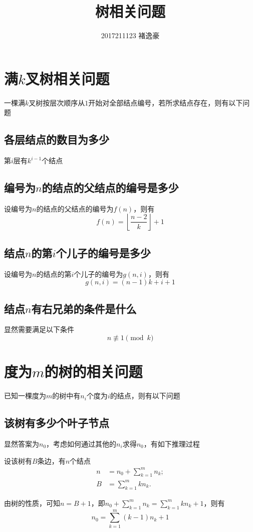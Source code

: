 \documentclass[UTF8]{ctexart}
\author{2017211123 褚逸豪}
\title{树相关问题}
\begin{document}
    \maketitle
    \section{满$k$叉树相关问题}
        一棵满$k$叉树按层次顺序从$1$开始对全部结点编号，若所求结点存在，则有以下问题
        \subsection{各层结点的数目为多少}
            第$i$层有$k^{i-1}$个结点
        \subsection{编号为$n$的结点的父结点的编号是多少}
            设编号为$n$的结点的父结点的编号为$f(n)$，则有
            $$f(n)=\left\lfloor\frac{n-2}{k}\right\rfloor+1$$
        \subsection{结点$n$的第$i$个儿子的编号是多少}
            设编号为$n$的结点的第$i$个儿子的编号为$g(n,i)$，则有
            $$g(n,i)=(n-1)k+i+1$$
        \subsection{结点$n$有右兄弟的条件是什么}
            显然需要满足以下条件
            $$n\not\equiv 1\pmod k$$
    \section{度为$m$的树的相关问题}
        已知一棵度为$m$的树中有$n_i$个度为$i$的结点，则有以下问题
        \subsection{该树有多少个叶子节点}
            显然答案为$n_0$，考虑如何通过其他的$n_i$求得$n_0$，有如下推理过程\par
            设该树有$B$条边，有$n$个结点
            $$\begin{aligned}
                n&=n_0+\sum_{k=1}^mn_k;\\
                B&=\sum_{k=1}^mkn_k.
            \end{aligned}$$\par
            由树的性质，可知$n=B+1$，即$n_0+\sum_{k=1}^mn_k=\sum_{k=1}^mkn_k+1$，则有
            $$n_0=\sum_{k=1}^m(k-1)n_k+1$$
\end{document}
